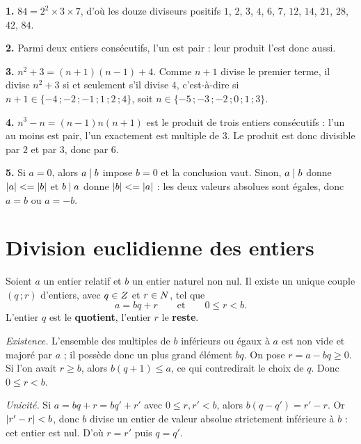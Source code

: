 \begin{corrige}
\textbf{1.} $84 = 2^{2}\times3\times7$, d'où les douze diviseurs positifs
$1$, $2$, $3$, $4$, $6$, $7$, $12$, $14$, $21$, $28$, $42$, $84$.

\textbf{2.} Parmi deux entiers consécutifs, l'un est pair : leur produit
l'est donc aussi.

\textbf{3.} $n^{2}+3 = (n+1)(n-1)+4$. Comme $n+1$ divise le premier terme,
il divise $n^{2}+3$ si et seulement s'il divise $4$, c'est-à-dire si
$n+1 \in \{-4\,;-2\,;-1\,;1\,;2\,;4\}$, soit
$n \in \{-5\,;-3\,;-2\,;0\,;1\,;3\}$.

\textbf{4.} $n^{3}-n = (n-1)n(n+1)$ est le produit de trois entiers
consécutifs : l'un au moins est pair, l'un exactement est multiple de $3$.
Le produit est donc divisible par $2$ et par $3$, donc par $6$.

\textbf{5.} Si $a = 0$, alors $a \mid b$ impose $b = 0$ et la conclusion
vaut. Sinon, $a \mid b$ donne $\left|a\right| <= \left|b\right|$ et $b \mid a$ donne
$\left|b\right| <= \left|a\right|$ : les deux valeurs absolues sont égales, donc
$a = b$ ou $a = -b$.
\end{corrige}

\section{Division euclidienne des entiers}

\begin{theoreme}
Soient $a$ un entier relatif et $b$ un entier naturel non nul. Il existe un
unique couple $(q\,;r)$ d'entiers, avec $q \in Z$ et $r \in N$, tel que
\[
  a = bq+r \qquad \text{et} \qquad 0 \leq r < b .
\]
L'entier $q$ est le \textbf{quotient}, l'entier $r$ le \textbf{reste}.
\end{theoreme}

\begin{demonstration}
\emph{Existence.} L'ensemble des multiples de $b$ inférieurs ou égaux à $a$
est non vide et majoré par $a$ ; il possède donc un plus grand élément $bq$.
On pose $r = a-bq \geq 0$. Si l'on avait $r \geq b$, alors $b(q+1) \leq a$,
ce qui contredirait le choix de $q$. Donc $0 \leq r < b$.

\smallskip
\emph{Unicité.} Si $a = bq+r = bq'+r'$ avec $0 \leq r,r' < b$, alors
$b(q-q') = r'-r$. Or $\left|r'-r\right| < b$, donc $b$ divise un entier de valeur
absolue strictement inférieure à $b$ : cet entier est nul. D'où $r = r'$ puis
$q = q'$.
\end{demonstration}

